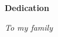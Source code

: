 
\newpage
\vspace*{0.9cm}
\begin{center}
{\bf \Huge Dedication}
\end{center}

\setlength{\baselineskip}{0.8cm}



\vspace{0.3\textheight}

\begin{center}
{\it To my family}
\end{center}
